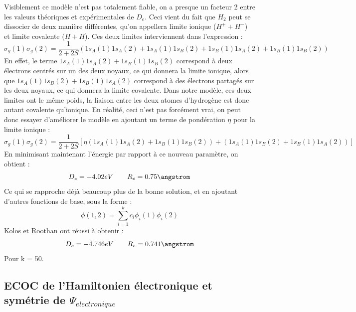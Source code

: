 Visiblement ce modèle n'est pas totalement fiable, on a presque un facteur 2 entre les valeurs théoriques et expérimentales de $D_e$. Ceci vient du fait que $H_2$ peut se dissocier de deux manière différentes, qu'on appellera limite ionique ($H^+ + H^-$) et limite covalente ($H+H$). Ces deux limites interviennent dans l'expression : 
\begin{equation*}
    \sigma_g(1)\sigma_g(2) = \frac{1}{2+2S}(1s_A(1)1s_A(2)+1s_A(1)1s_B(2)+1s_B(1)1s_A(2)+1s_B(1)1s_B(2))
\end{equation*}
En effet, le terme $1s_A(1)1s_A(2)+1s_B(1)1s_B(2)$ correspond à deux électrons centrés sur un des deux noyaux, ce qui donnera la limite ionique, alors que $1s_A(1)1s_B(2)+1s_B(1)1s_A(2)$ correspond à des électrons partagés sur les deux noyaux, ce qui donnera la limite covalente.\newline
Dans notre modèle, ces deux limites ont le même poids, la liaison entre les deux atomes d'hydrogène est donc autant covalente qu'ionique. En réalité, ceci n'est pas forcément vrai, on peut donc essayer d'améliorer le modèle en ajoutant un terme de pondération $\eta$ pour la limite ionique :
\begin{equation*}
    \sigma_g(1)\sigma_g(2) = \frac{1}{2+2S}[\eta(1s_A(1)1s_A(2)+1s_B(1)1s_B(2)) + (1s_A(1)1s_B(2)+1s_B(1)1s_A(2))]
\end{equation*}
En minimisant maintenant l'énergie par rapport à ce nouveau paramètre, on obtient :
\begin{equation*}
    D_e = -4.02eV \quad \quad R_e = 0.75\angstrom
\end{equation*}
Ce qui se rapproche déjà beaucoup plus de la bonne solution, et en ajoutant d'autres fonctions de base, sous la forme : 
\begin{equation*}
    \phi(1,2) = \sum\limits_{i=1}^kc_i\phi_i(1)\phi_i(2)
\end{equation*}
Kolos et Roothan ont réussi à obtenir :
\begin{equation*}
    D_e = -4.746eV \quad \quad R_e = 0.741\angstrom
\end{equation*}
Pour k = 50.

\subsection{ECOC de l'Hamiltonien électronique et symétrie de $\Psi_{electronique}$}

